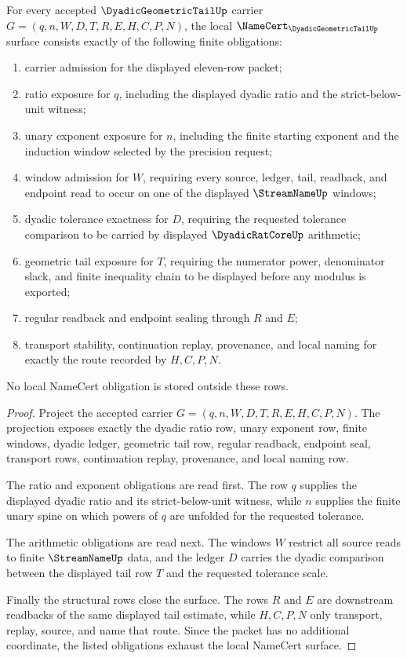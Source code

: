 \begin{theorem}
\label{thm:dyadic-geometric-tail-namecert-obligations}
For every accepted $\DyadicGeometricTailUp$ carrier $G=(q,n,W,D,T,R,E,H,C,P,N)$, the local $\NameCert_{\DyadicGeometricTailUp}$ surface consists exactly of the following finite obligations:
\begin{enumerate}
\item carrier admission for the displayed eleven-row packet;
\item ratio exposure for $q$, including the displayed dyadic ratio and the strict-below-unit witness;
\item unary exponent exposure for $n$, including the finite starting exponent and the induction window selected by the precision request;
\item window admission for $W$, requiring every source, ledger, tail, readback, and endpoint read to occur on one of the displayed $\StreamNameUp$ windows;
\item dyadic tolerance exactness for $D$, requiring the requested tolerance comparison to be carried by displayed $\DyadicRatCoreUp$ arithmetic;
\item geometric tail exposure for $T$, requiring the numerator power, denominator slack, and finite inequality chain to be displayed before any modulus is exported;
\item regular readback and endpoint sealing through $R$ and $E$;
\item transport stability, continuation replay, provenance, and local naming for exactly the route recorded by $H,C,P,N$.
\end{enumerate}
No local NameCert obligation is stored outside these rows.
\end{theorem}
\begin{proof}
Project the accepted carrier $G=(q,n,W,D,T,R,E,H,C,P,N)$. The projection exposes exactly the dyadic ratio row, unary exponent row, finite windows, dyadic ledger, geometric tail row, regular readback, endpoint seal, transport rows, continuation replay, provenance, and local naming row.

The ratio and exponent obligations are read first. The row $q$ supplies the displayed dyadic ratio and its strict-below-unit witness, while $n$ supplies the finite unary spine on which powers of $q$ are unfolded for the requested tolerance.

The arithmetic obligations are read next. The windows $W$ restrict all source reads to finite $\StreamNameUp$ data, and the ledger $D$ carries the dyadic comparison between the displayed tail row $T$ and the requested tolerance scale.

Finally the structural rows close the surface. The rows $R$ and $E$ are downstream readbacks of the same displayed tail estimate, while $H,C,P,N$ only transport, replay, source, and name that route. Since the packet has no additional coordinate, the listed obligations exhaust the local NameCert surface.
\end{proof}

